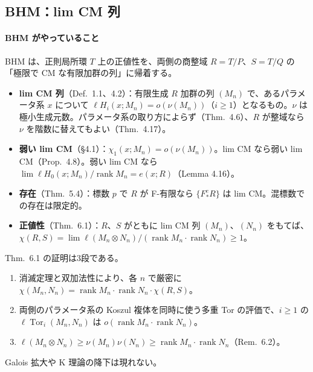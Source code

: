\documentclass[11pt,a4paper]{ltjsarticle}
\numberwithin{equation}{section}
\theoremstyle{plain}
\theoremstyle{definition}
\theoremstyle{definition}
\newcommand{\Tor}{\operatorname{Tor}}
\newcommand{\rank}{\operatorname{rank}}
\begin{document}
\subsection{BHM：lim CM 列}\label{sec:prior-bhm}

\paragraph{BHM がやっていること}
BHM は、正則局所環 $T$ 上の正値性を、両側の商整域 $R = T/P$、$S = T/Q$ の「極限で CM な有限加群の列」に帰着する。
\begin{itemize}
  \item \textbf{lim CM 列}（Def.~1.1、4.2）：有限生成 $R$ 加群の列 $(M_n)$ で、あるパラメータ系 $x$ について $\ell H_i(x;M_n) = o(\nu(M_n))$（$i\ge1$）となるもの。$\nu$ は極小生成元数。パラメータ系の取り方によらず（Thm.~4.6）、$R$ が整域なら $\nu$ を階数に替えてもよい（Thm.~4.17）。
  \item \textbf{弱い lim CM}（§4.1）：$\chi_1(x;M_n) = o(\nu(M_n))$。lim CM なら弱い lim CM（Prop.~4.8）。弱い lim CM なら $\lim\ell H_0(x;M_n)/\rank M_n = e(x;R)$（Lemma 4.16）。
  \item \textbf{存在}（Thm.~5.4）：標数 $p$ で $R$ が F-有限なら $\{F^e_*R\}$ は lim CM。混標数での存在は限定的。
  \item \textbf{正値性}（Thm.~6.1）：$R$、$S$ がともに lim CM 列 $(M_n)$、$(N_n)$ をもてば、$\chi(R,S) = \lim\ell(M_n\otimes N_n)/(\rank M_n\cdot\rank N_n)\ge1$。
\end{itemize}
Thm.~6.1 の証明は3段である。
\begin{enumerate}
  \item 消滅定理と双加法性により、各 $n$ で厳密に $\chi(M_n,N_n) = \rank M_n\cdot\rank N_n\cdot\chi(R,S)$。
  \item 両側のパラメータ系の Koszul 複体を同時に使う多重 Tor の評価で、$i\ge1$ の $\ell\Tor_i(M_n,N_n)$ は $o(\rank M_n\cdot\rank N_n)$。
  \item $\ell(M_n\otimes N_n)\ge\nu(M_n)\nu(N_n)\ge\rank M_n\cdot\rank N_n$（Rem.~6.2）。
\end{enumerate}
Galois 拡大や K 理論の降下は現れない。
\end{document}
